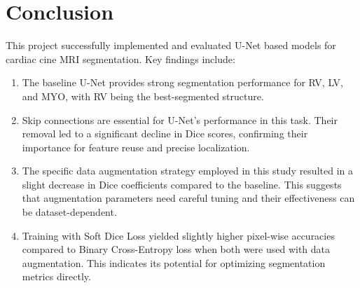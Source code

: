 \documentclass{article}
\begin{document}
\section{Conclusion}
This project successfully implemented and evaluated U-Net based models for cardiac cine MRI segmentation. Key findings include:
\begin{enumerate}
  \item The baseline U-Net provides strong segmentation performance for RV, LV, and MYO, with RV being the best-segmented structure.
  \item Skip connections are essential for U-Net's performance in this task. Their removal led to a significant decline in Dice scores,
        confirming their importance for feature reuse and precise localization.
  \item The specific data augmentation strategy employed in this study resulted in a slight decrease in Dice coefficients compared to
        the baseline. This suggests that augmentation parameters need careful tuning and their effectiveness can be dataset-dependent.
  \item Training with Soft Dice Loss yielded slightly higher pixel-wise accuracies compared to Binary Cross-Entropy loss when both
        were used with data augmentation. This indicates its potential for optimizing segmentation metrics directly.
\end{enumerate}







\end{document}
